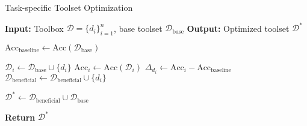 
\begin{algorithm}[!th]
    \caption{Task-specific Toolset Optimization}
    \label{alg:tool_selection_optimization}
    \begin{algorithmic}[1]
    \STATE \textbf{Input:} Toolbox $\mathcal{D} = \{d_i\}_{i=1}^n$, base toolset $\mathcal{D}_\text{base}$
    \STATE \textbf{Output:} Optimized toolset $\mathcal{D}^*$
    
    \STATE {}
    \STATE $\text{Acc}_\text{baseline} \gets \text{Acc}(\mathcal{D}_\text{base})$
    
    \STATE {}
        \STATE $\mathcal{D}_i \gets \mathcal{D}_\text{base} \cup \{ d_i \}$
        \STATE $\text{Acc}_i \gets \text{Acc}(\mathcal{D}_i)$
        \STATE $\Delta_{d_i} \gets \text{Acc}_i - \text{Acc}_\text{baseline}$
            \STATE $\mathcal{D}_\text{beneficial} \gets \mathcal{D}_\text{beneficial} \cup \{ d_i \}$
        \ENDIF
    \ENDFOR
    
    \STATE {}
    \STATE $\mathcal{D}^* \gets \mathcal{D}_\text{beneficial} \cup \mathcal{D}_\text{base}$
    
    \STATE \textbf{Return} $\mathcal{D}^*$
    \end{algorithmic}
\end{algorithm}
